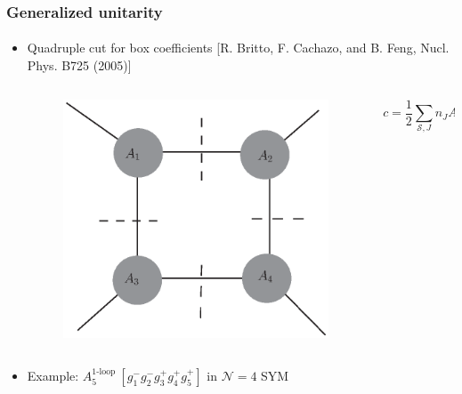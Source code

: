 \documentclass[english]{beamer}
\begin{document}

\begin{frame}[shrink=10]
\frametitle{Generalized unitarity}
\framesubtitle{}
\begin{itemize}

\item<1-> Quadruple cut for box coefficients
    \tiny\color{blue}
[R. Britto, F. Cachazo, and B. Feng, Nucl. Phys. B725 (2005)]
\color{black}\normalsize
\begin{columns}
\begin{column}{0.5\textwidth}
\begin{figure}[h]
  \centering
  \includegraphics[width=0.4\linewidth]{quadruple_cut.eps}
\end{figure}\end{column}
\begin{column}{0.5\textwidth}  %

\begin{equation*}
c = \frac{1}{2}\sum_{\mathcal{S}, J}n_J A_1^{\mathrm{tree}}A_2^{\mathrm{tree}}A_3^{\mathrm{tree}}A_4^{\mathrm{tree}}
\end{equation*}

\end{column}
\end{columns}
\item<2-> Example:  $A_5^{\textrm{1-loop }}[g_1^-g_2^-g_3^+g_4^+g_5^+]$ in  $\mathcal{N}=4$ SYM
\end{itemize}
\end{frame}
\end{document}
